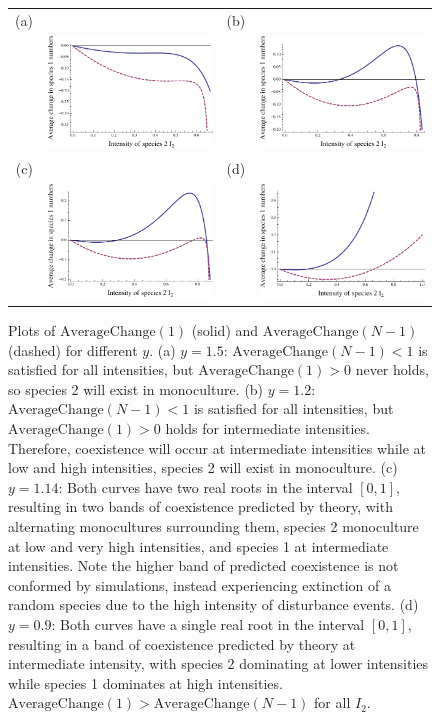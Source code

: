\documentclass[preprint,10pt,reqno]{report}
\begin{document}
\begin{figure}[htbp]
\begin{tabular}{rrrr}
(a)&&(b)&\\
&\includegraphics[width=2in]{highy.pdf}&&\includegraphics[width=2in]{lbworkubnot.pdf} \\
(c)&&(d)&\\
&\includegraphics[width=2in]{fourbits.pdf}&&\includegraphics[width=2in]{onerooteach.pdf} \\
\end{tabular}
\caption{Plots of $\text{AverageChange}(1)$ (solid) and $\text{AverageChange}(N-1)$ (dashed) for different $y$. (a) $y=1.5$: $\text{AverageChange}(N-1)<1$ is satisfied for all intensities, but $\text{AverageChange}(1)>0$ never holds, so species 2 will exist in monoculture. (b) $y=1.2$:  $\text{AverageChange}(N-1)<1$ is satisfied for all intensities, but $\text{AverageChange}(1)>0$ holds for intermediate intensities. Therefore, coexistence will occur at intermediate intensities while at low and high intensities, species 2 will exist in monoculture. (c) $y=1.14$: Both curves have two real roots in the interval $[0,1]$, resulting in two bands of coexistence predicted by theory, with alternating monocultures surrounding them, species 2 monoculture at low and very high intensities, and species 1 at intermediate intensities. Note the higher band of predicted coexistence is not conformed by simulations, instead experiencing extinction of a random species due to the high intensity of disturbance events. (d) $y=0.9$: Both curves have a single real root in the interval $[0,1]$, resulting in a band of coexistence predicted by theory at intermediate intensity, with species 2 dominating at lower intensities while species 1 dominates at high intensities. $\text{AverageChange}(1)>\text{AverageChange}(N-1)$ for all $I_2$.}

\end{figure}
\end{document}
